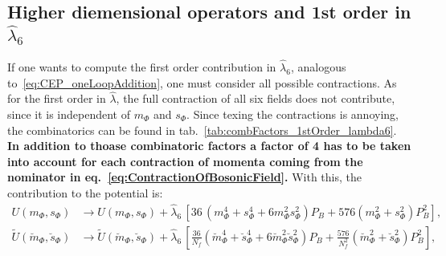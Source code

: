 \subsection*{Higher diemensional operators and 1st order in $\hat\lambda_6$}

If one wants to compute the first order contribution in $\hat\lambda_6$, analogous to~\eqref{eq:CEP_oneLoopAddition}, one must consider all possible contractions.
As for the first order in $\hat \lambda$, the full contraction of all six fields does not contribute, since it is independent of $m_{\Phi}$ and $s_{\Phi}$. Since texing the 
contractions is annoying, the combinatorics can be found in tab.~\ref{tab:combFactors_1stOrder_lambda6}. \textbf{In addition to thoase combinatoric
factors a factor of 4 has to be taken into account for each contraction of momenta coming from the nominator in eq.~\eqref{eq:ContractionOfBosonicField}.}
With this, the contribution to the potential is:
\begin{align}\label{eq:CEP_1stOrderContribution_lambda6}
 U(m_{\Phi}, s_{\Phi}) & \rightarrow 
                          U(m_{\Phi}, s_{\Phi})  +  \hat \lambda_6\, \left[ 36\, \left(m_{\Phi}^4 + s_{\Phi}^4 + 6 m_{\Phi}^2 s_{\Phi}^2\right) P_B 
                          + 576 \left(m_{\Phi}^2 + s_{\Phi}^2 \right) P_B^2 \right],
        \\ \label{eq:CEP_1stOrderContribution_lambda6_rescaled}
 \tilde U(\breve{m}_{\Phi},\breve{s}_{\Phi}) & \rightarrow  
       \tilde U(\breve{m}_{\Phi},\breve{s}_{\Phi}) 
                          + \hat \lambda_6\, \left[ \frac{36}{N_f} \left(\breve m_{\Phi}^4 + \breve s_{\Phi}^4 + 6 \breve m_{\Phi}^2 \breve s_{\Phi}^2\right) P_B 
                          + \frac{576}{N_f^2} \left(\breve m_{\Phi}^2 + \breve s_{\Phi}^2 \right) P_B^2 \right],
\end{align}

